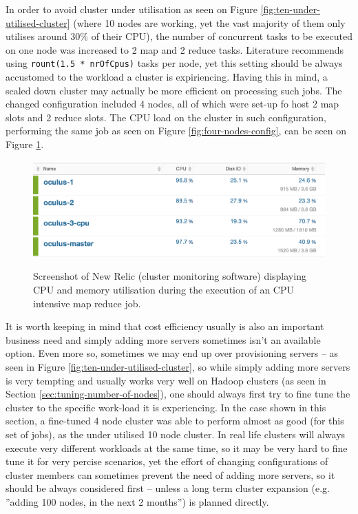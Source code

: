 In order to avoid cluster under utilisation as seen on Figure \ref{fig:ten-under-utilised-cluster} (where 10 nodes are working, yet the vast majority of them only utilises around 30\% of their CPU), the number of concurrent tasks to be executed on one node was increased to 2 map and 2 reduce tasks. Literature recommends using \verb|rount(1.5 * nrOfCpus)| tasks per node, yet this setting should be always accustomed to the workload a cluster is expiriencing. Having this in mind, a scaled down cluster may actually be more efficient on processing such jobs. The changed configuration included 4 nodes, all of which were set-up fo host 2 map slots and 2 reduce slots. The CPU load on the cluster in such configuration, performing the same job as seen on Figure \ref{fig:four-nodes-config}, can be seen on Figure \ref{fig:cpu-load-during-job}.

\begin{figure}[ch!]
  \centering
  \includegraphics[width=\textwidth]{img/hadoop/monitoring-during-processing}
  \label{fig:cpu-load-during-job}
  \caption{Screenshot of New Relic (cluster monitoring software) displaying CPU and memory utilisation during the execution of an CPU intensive map reduce job.}
\end{figure}

It is worth keeping in mind that cost efficiency usually is also an important business need and simply adding more servers sometimes isn't an available option. Even more so, sometimes we may end up over provisioning servers -- as seen in Figure \ref{fig:ten-under-utilised-cluster}, so while simply adding more servers is very tempting and usually works very well on Hadoop clusters (as seen in Section \ref{sec:tuning-number-of-nodes}), one should always first try to fine tune the cluster to the specific work-load it is experiencing. In the case shown in this section, a fine-tuned 4 node cluster was able to perform almost as good (for this set of jobs), as the under utilised 10 node cluster. In real life clusters will always execute very different workloads at the same time, so it may be very hard to fine tune it for very percise scenarios, yet the effort of changing configurations of cluster members can sometimes prevent the need of adding more servers, so it should be always considered first -- unless a long term cluster expansion (e.g. ''adding 100 nodes, in the next 2 months'') is planned directly.

